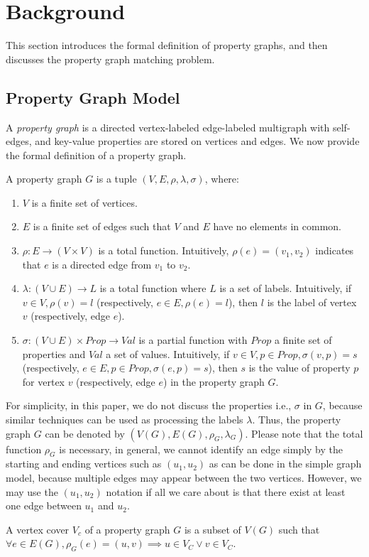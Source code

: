 \section{Background}\label{sec:background}
This section introduces the formal definition of property graphs, and then discusses the property graph matching problem.
\subsection{Property Graph Model}
A \emph{property graph} is a directed vertex-labeled edge-labeled multigraph with self-edges,
and key-value properties are stored on vertices and edges.
We now provide the formal definition of a property graph.
\begin{definition}
  A property graph $G$ is a tuple $(V, E, \rho, \lambda, \sigma)$, where:
  \begin{enumerate}[noitemsep,label={(\arabic*)}]
  \item $V$ is a finite set of vertices.
  \item $E$ is a finite set of edges such that $V$ and $E$ have no elements in common.
  \item $\rho: E \rightarrow (V \times V)$ is a total function.
    Intuitively, $\rho(e) = (v_1, v_2)$ indicates that $e$ is a directed edge from $v_1$ to $v_2$.
  \item $\lambda :(V \cup E) \rightarrow L$ is a total function where $L$ is a set of labels.
    Intuitively, if $v \in V, \rho(v) = l$ (respectively, $e \in E, \rho(e) = l$),
    then $l$ is the label of vertex $v$ (respectively, edge $e$).
  \item $\sigma: (V \cup E) \times Prop \rightarrow Val$ is a partial function with $Prop$ a finite set of properties and $Val$ a set of values.
    Intuitively, if $v \in V, p \in Prop, \sigma(v, p) = s$ (respectively, $e \in E, p \in Prop, \sigma(e, p) = s$),
    then $s$ is the value of property $p$ for vertex $v$ (respectively, edge $e$) in the property graph $G$.
  \end{enumerate}
\end{definition}
For simplicity, in this paper, we do not discuss the properties i.e., $\sigma$ in $G$,
because similar techniques can be used as processing the labels $\lambda$.
Thus, the property graph $G$ can be denoted by $(V(G), E(G), \rho_G, \lambda_G)$.
Please note that the total function $\rho_G$ is necessary, in general,
we cannot identify an edge simply by the starting and ending vertices such as $(u_1, u_2)$ as can be done in the simple graph model,
because multiple edges may appear between the two vertices.
However, we may use the $(u_1, u_2)$ notation if all we care about is that there exist at least one edge between $u_1$ and $u_2$.
\begin{definition}
  A vertex cover $V_c$ of a property graph $G$ is a subset of $V(G)$ such that
  $\forall e \in E(G), \rho_G(e) = (u, v) \implies u \in V_C \lor v \in V_C$.
\end{definition}
